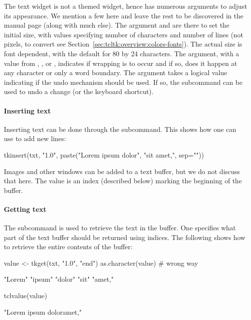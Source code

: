 The text widget is not a themed widget, hence has numerous arguments
to adjust its appearance. We mention a few here and leave the rest to
be discovered in the manual page (along with much else). The argument
 and  are there to
set the initial size, with values specifying number of characters and
number of lines (not pixels, to convert see
Section~\ref{sec:tcltk:overview:colors-fonts}). The actual size is
font dependent, with the default for 80 by 24 characters. The
 argument, with a value from ,
, or , indicates if wrapping is to occur and
if so, does it happen at any character or only a word boundary. The
argument  takes a logical value indicating if
the undo mechanism should be used. If so, the subcommand
 can be used to undo a change (or the
 keyboard shortcut).

\paragraph{Inserting text}
Inserting text can be done through the 
subcommand. This shows how one can use  to add new
lines:
\begin{Schunk}
\begin{Sinput}
 tkinsert(txt, 
          "1.0", 
          paste("Lorem ipsum dolor",
                "sit amet,", sep="\n"))
\end{Sinput}
\end{Schunk}
Images and other windows can be added to a text buffer, but we do not
discuss that here. The value  is an index (described below)
marking the beginning of the buffer.

\paragraph{Getting text}
The  subcommand is used to retrieve the text
in the buffer. One specifies what part of the text buffer should be
returned using indices. The following shows how to retrieve the entire
contents of the buffer:

\begin{Schunk}
\begin{Sinput}
 value <- tkget(txt, "1.0", "end")
 as.character(value)                     # wrong way
\end{Sinput}
\begin{Soutput}
[1] "Lorem" "ipsum" "dolor" "sit"   "amet,"
\end{Soutput}
\begin{Sinput}
 tclvalue(value)
\end{Sinput}
\begin{Soutput}
[1] "Lorem ipsum dolor\nsit amet,\n"
\end{Soutput}
\end{Schunk}

